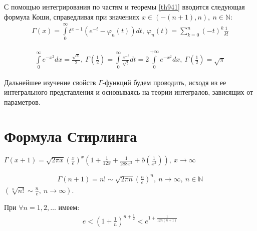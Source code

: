 \begin{remark}
  С помощью интегрирования по частям и теоремы \eqref{th941} вводится следующая
  формула Коши, справедливая при значениях $x \in (-(n + 1), n), \ n \in
  \mathbb{N}$:
  \begin{gather*}
    \Gamma(x) = \int\limits_0^\infty t^{x-1} (e^{-t} - \varphi_n(t)) dt, \
    \varphi_n(t) = \sum\limits_{k = 0}^{n} (-t)^k \frac{1}{k!}
  \end{gather*}
\end{remark}

\begin{consequence}
  \begin{gather*}
    \int\limits_0^\infty e^{-x^2} dx = \frac{\sqrt{\pi}}{2}, \
    \Gamma\left(  \frac{1}{2} \right) = \int\limits_0^\infty
    \frac{e^{-t}}{\sqrt{t}} dt = 2 \int\limits_0^{+\infty} e^{-x^2} dx, \
    \Gamma\left( \frac{1}{2} \right) = \sqrt{\pi}
  \end{gather*}
\end{consequence}

Дальнейшее изучение свойств $\Gamma$-функций будем проводить, исходя из ее
интегрального представления и основываясь на теории интегралов, зависящих от
параметров.

\section{Формула Стирлинга}

$\Gamma(x+1) = \sqrt{2\pi x} \left( \frac{x}{e} \right)^x\left( 1 +
\frac{1}{12x} + \frac{1}{288x^2} + \bar{\bar{o}}\left(\frac{1}{x^3}\right)
\right), \ x \to \infty$
\begin{theorem}
  \label{th951}
  \begin{gather}
    \Gamma(n + 1) = n! \sim \sqrt{2\pi n}\left( \frac{n}{e} \right)^n, \ n\to
    \infty, \ n \in \mathbb{N}
    \label{ch95:eq1}
  \end{gather}
  $(\sqrt[n]{n!} \sim \frac{n}{e}, \ n \to \infty)$.
\end{theorem}

\begin{lemma}
  \label{lem951}
  При $\forall n = 1, 2, \dots$ имеем:
  \begin{gather}
    e < \left( 1 + \frac{1}{n} \right)^{n + \frac{1}{2}} < e^{1 +
      \frac{1}{12n(n+1)}}
    \label{lem951:eq1}
  \end{gather}
\end{lemma}

